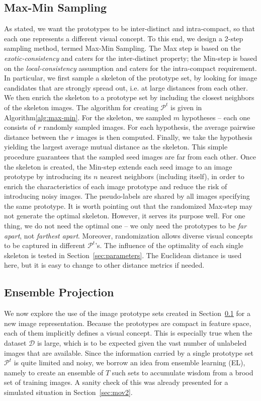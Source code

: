 \documentclass[preprint,12pt,3p]{elsarticle}
\begin{document}
\subsection{Max-Min Sampling} 
\label{sec:max-min}
As stated, we want the prototypes to be inter-distinct and
intra-compact, so that each one represents a different visual
concept. To this end, we design a 2-step sampling method, termed
Max-Min Sampling. The Max step is based on the
\emph{exotic-consistency} and caters for the inter-distinct
property; the Min-step is based on the \emph{local-consistency}
assumption and caters for the intra-compact requirement. In particular, we first
sample a skeleton of the prototype set,  by looking for image
candidates that are strongly spread out, i.e. at large distances from
each other. We then enrich the skeleton to a prototype set by
including the closest neighbors of the skeleton images.
The algorithm for creating $\mathcal{P}^t$ is given in
Algorithm\ref{alg:max-min}. For the skeleton, we sampled $m$
hypotheses -- each one consists of $r$ randomly sampled images. 
For each hypothesis, the average pairwise distance between the $r$ images is then computed. 
Finally, we take the hypothesis yielding the largest average mutual distance as the skeleton. 
This simple
procedure guarantees that the sampled seed images are far from each
other. Once the skeleton is created, the Min-step extends each seed
image to an image prototype by introducing its $n$ nearest neighbors
(including itself), in order to enrich the characteristics of each
image prototype and reduce the risk of introducing noisy images. The
pseudo-labels are shared by all images specifying the same prototype.
It is worth pointing out that the randomized Max-step may not generate
the optimal skeleton. However, it serves its purpose well. For one thing, we do not need the optimal one -- we only need the prototypes
to be \emph{far apart}, not \emph{farthest apart}.  Moreover, randomization allows diverse visual
concepts to be captured in different $\mathcal{P}^t$'s. 
The influence of the optimality of each single skeleton is tested in Section~\ref{sec:parameters}.
The Euclidean distance is used here, but it is easy to change to other distance metrics if needed. 

\subsection{Ensemble Projection}
We now explore the use of the image prototype sets created in
Section~\ref{sec:max-min} for a new image representation.  Because the
prototypes are compact in feature space, each of them implicitly
defines a visual concept. This is especially true
when the dataset $\mathcal{D}$ is large, which is to be
expected given the vast number of unlabeled images that are
available.  Since the information carried by a single prototype set
$\mathcal{P}^t$ is quite limited and noisy, we borrow an idea from
ensemble learning (EL), namely to create an ensemble of $T$ such sets to
accumulate wisdom from a brood set of training images. A sanity check of this was
already presented for a simulated situation in Section~\ref{sec:mov2}.
\end{document}
